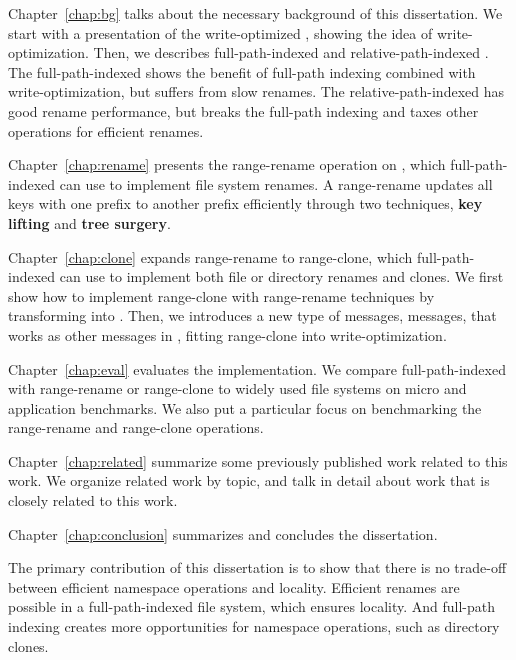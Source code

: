 Chapter~\ref{chap:bg} talks about the necessary background of this dissertation.
We start with a presentation of the write-optimized \bets,
showing the idea of write-optimization.
Then, we describes full-path-indexed \betrfs and relative-path-indexed \betrfs.
The full-path-indexed \betrfs shows the benefit of full-path indexing combined
with write-optimization, but suffers from slow renames.
The relative-path-indexed \betrfs has good rename performance, but breaks the
full-path indexing and taxes other operations for efficient renames.

Chapter~\ref{chap:rename} presents the range-rename operation on \bets,
which full-path-indexed \betrfs can use to implement file system renames.
A range-rename updates all keys with one prefix to another prefix efficiently
through two techniques, \textbf{key lifting} and \textbf{tree surgery}.

Chapter~\ref{chap:clone} expands range-rename to range-clone,
which full-path-indexed \betrfs can use to implement both file or directory
renames and clones.
We first show how to implement range-clone with range-rename techniques by
transforming \bets into \bedags.
Then, we introduces a new type of messages, \goto messages, that works as other
messages in \bedags, fitting range-clone into write-optimization.

Chapter~\ref{chap:eval} evaluates the implementation.
We compare full-path-indexed \betrfs with range-rename or range-clone to
widely used file systems on micro and application benchmarks.
We also put a particular focus on benchmarking the range-rename and range-clone
operations.

Chapter~\ref{chap:related} summarize some previously published work related to
this work.
We organize related work by topic, and talk in detail about work that is closely
related to this work.

Chapter~\ref{chap:conclusion} summarizes and concludes the dissertation.

The primary contribution of this dissertation is to show that there is no
trade-off between efficient namespace operations and locality.
Efficient renames are possible in a full-path-indexed file system, which ensures
locality.
And full-path indexing creates more opportunities for namespace operations,
such as directory clones.

